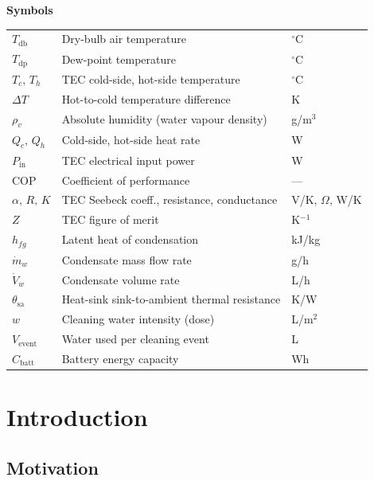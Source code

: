 \documentclass[12pt,a4paper]{report}   %
\begin{document}
\vspace{1.0em}
\pagebreak
\noindent\textbf{Symbols}\\[0.4em]
\noindent\begin{tabular}{@{}p{2.6cm}p{9.8cm}p{2.4cm}@{}}
$T_{\mathrm{db}}$ & Dry-bulb air temperature & $^\circ$C \\
$T_{\mathrm{dp}}$ & Dew-point temperature & $^\circ$C \\
$T_c,\,T_h$ & TEC cold-side, hot-side temperature & $^\circ$C \\
$\Delta T$ & Hot-to-cold temperature difference & K \\
$\rho_v$ & Absolute humidity (water vapour density) & g/m$^3$ \\
$Q_c,\,Q_h$ & Cold-side, hot-side heat rate & W \\
$P_{\mathrm{in}}$ & TEC electrical input power & W \\
$\mathrm{COP}$ & Coefficient of performance & --- \\
$\alpha,\,R,\,K$ & TEC Seebeck coeff., resistance, conductance & V/K, $\Omega$, W/K \\
$Z$ & TEC figure of merit & K$^{-1}$ \\
$h_{fg}$ & Latent heat of condensation & kJ/kg \\
$\dot{m}_w$ & Condensate mass flow rate & g/h \\
$\dot{V}_w$ & Condensate volume rate & L/h \\
$\theta_{\mathrm{sa}}$ & Heat-sink sink-to-ambient thermal resistance & K/W \\
$w$ & Cleaning water intensity (dose) & L/m$^2$ \\
$V_{\mathrm{event}}$ & Water used per cleaning event & L \\
$C_{\mathrm{batt}}$ & Battery energy capacity & Wh \\
\end{tabular}

\cleardoublepage
{}

\chapter{Introduction}
\label{ch:intro}

\section{Motivation}
\end{document}
